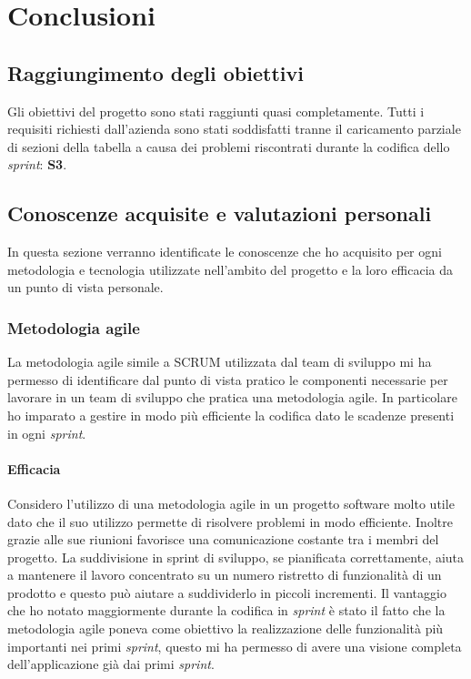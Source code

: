 
\chapter{Conclusioni}
\label{cap:conclusioni}
\section{Raggiungimento degli obiettivi}
Gli obiettivi del progetto sono stati raggiunti quasi completamente. Tutti i requisiti richiesti dall'azienda sono stati soddisfatti tranne il caricamento parziale di sezioni della tabella a causa dei problemi riscontrati durante la codifica dello \emph{sprint}: \textbf{S3}.

\section{Conoscenze acquisite e valutazioni personali}
In questa sezione verranno identificate le conoscenze che ho acquisito per ogni metodologia e tecnologia utilizzate nell'ambito del progetto e la loro efficacia da un punto di vista personale.

\subsection{Metodologia agile}
La metodologia agile simile a SCRUM utilizzata dal team di sviluppo mi ha permesso di identificare dal punto di vista pratico le componenti necessarie per lavorare in un team di sviluppo che pratica una metodologia agile. In particolare ho imparato a gestire in modo più efficiente la codifica dato le scadenze presenti in ogni \emph{sprint}. 

\subsubsection*{Efficacia}
Considero l'utilizzo di una metodologia agile in un progetto software molto utile dato che il suo utilizzo permette di risolvere problemi in modo efficiente. Inoltre grazie alle sue riunioni favorisce una comunicazione costante tra i membri del progetto. La suddivisione in sprint di sviluppo, se pianificata correttamente, aiuta a mantenere il lavoro concentrato su un numero ristretto di funzionalità di un prodotto e questo può aiutare a suddividerlo in piccoli incrementi. Il vantaggio che ho notato maggiormente durante la codifica in \emph{sprint} è stato il fatto che la metodologia agile poneva come obiettivo la realizzazione delle funzionalità più importanti nei primi \emph{sprint}, questo mi ha permesso di avere una visione completa dell'applicazione già dai primi \emph{sprint}.

